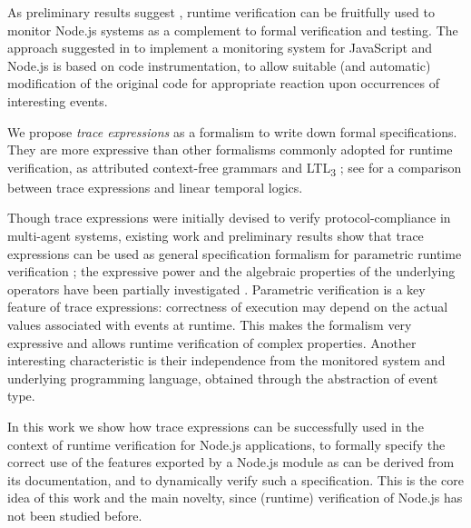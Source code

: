 As preliminary results suggest \cite{TowardsIoT17}, runtime verification can be fruitfully used to monitor Node.js systems as a complement to formal verification and testing.
The approach suggested in \cite{TowardsIoT17} to implement a monitoring system for JavaScript and Node.js is based on code instrumentation, to allow suitable (and automatic) modification of the original code for appropriate reaction upon occurrences of interesting events.

We propose \emph{trace expressions} \cite{ancona2016comparing} as a formalism to write down formal specifications.
They are more expressive than other formalisms commonly adopted for runtime verification, as
attributed context-free grammars \cite{de2014combining} and LTL\textsubscript{3} \cite{ltl3}; see \cite{AnconaFM16} for a comparison between trace expressions and linear temporal logics.

Though trace expressions were initially devised to verify protocol-compliance in multi-agent systems, existing work and preliminary results show that trace expressions can be used as general specification formalism for parametric runtime verification \cite{ParametricJava17, TowardsIoT17};
the expressive power and the algebraic properties of the underlying operators have been partially investigated \cite{ParametricJava17,ancona2016comparing}.
Parametric verification is a key feature of trace expressions: correctness of execution may depend on the actual values associated with events at runtime.
This makes the formalism very expressive and allows runtime verification of complex properties.
Another interesting characteristic is their independence from the monitored system and underlying programming language,
obtained through the abstraction of event type.

In this work we show how trace expressions can be successfully used in the context of runtime verification for
Node.js applications, to formally specify the correct use of the features exported by a Node.js module as
can be derived from its documentation, and to dynamically verify such a specification.
This is the core idea of this work and the main novelty, since (runtime) verification of Node.js has not been studied before.

